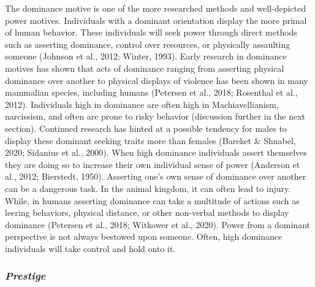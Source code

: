 \documentclass[
  english,
  a4paper,floatsintext]{apa7}
\begin{document}
The dominance motive is one of the more researched methods and well-depicted power motives. Individuals with a dominant orientation display the more primal of human behavior. These individuals will seek power through direct methods such as asserting dominance, control over resources, or physically assaulting someone (Johnson et al., 2012; Winter, 1993). Early research in dominance motives has shown that acts of dominance ranging from asserting physical dominance over another to physical displays of violence has been shown in many mammalian species, including humans (Petersen et al., 2018; Rosenthal et al., 2012).
Individuals high in dominance are often high in Machiavellianism, narcissism, and often are prone to risky behavior (discussion further in the next section). Continued research has hinted at a possible tendency for males to display these dominant seeking traits more than females (Bareket \& Shnabel, 2020; Sidanius et al., 2000). When high dominance individuals assert themselves they are doing so to increase their own individual sense of power (Anderson et al., 2012; Bierstedt, 1950). Asserting one's own sense of dominance over another can be a dangerous task. In the animal kingdom, it can often lead to injury. While, in humans asserting dominance can take a multitude of actions such as leering behaviors, physical distance, or other non-verbal methods to display dominance (Petersen et al., 2018; Witkower et al., 2020). Power from a dominant perspective is not always bestowed upon someone. Often, high dominance individuals will take control and hold onto it.

\hypertarget{prestige}{%
\subsubsection{\texorpdfstring{\emph{Prestige}}{Prestige}}\label{prestige}}
\end{document}
